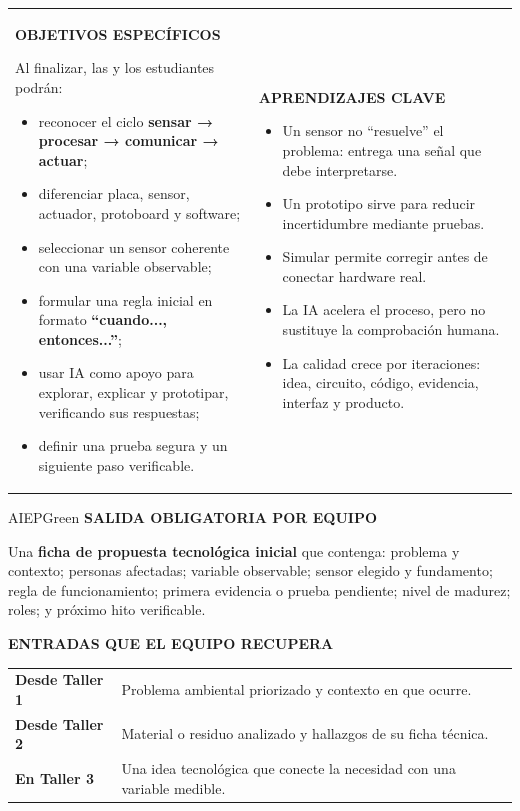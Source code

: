 \documentclass[10pt,a4paper]{article}
\newcommand{\labeltext}[1]{%
  {\scriptsize\bfseries\color{AIEPSlate}\MakeUppercase{#1}}\par\vspace{1.2mm}
}
\begin{document}
\begin{tabularx}{\textwidth}{Y Y}
\begin{card}[height=69mm,valign=top]
\labeltext{Objetivos específicos}
Al finalizar, las y los estudiantes podrán:
\begin{itemize}
  \item reconocer el ciclo \textbf{sensar → procesar → comunicar → actuar};
  \item diferenciar placa, sensor, actuador, protoboard y software;
  \item seleccionar un sensor coherente con una variable observable;
  \item formular una regla inicial en formato \textbf{“cuando..., entonces...”};
  \item usar IA como apoyo para explorar, explicar y prototipar, verificando sus respuestas;
  \item definir una prueba segura y un siguiente paso verificable.
\end{itemize}
\end{card}
&
\begin{card}[height=69mm,valign=top]
\labeltext{Aprendizajes clave}
\begin{itemize}
  \item Un sensor no “resuelve” el problema: entrega una señal que debe interpretarse.
  \item Un prototipo sirve para reducir incertidumbre mediante pruebas.
  \item Simular permite corregir antes de conectar hardware real.
  \item La IA acelera el proceso, pero no sustituye la comprobación humana.
  \item La calidad crece por iteraciones: idea, circuito, código, evidencia, interfaz y producto.
\end{itemize}
\end{card}
\end{tabularx}

\begin{softcard}{AIEPGreen}
\labeltext{Salida obligatoria por equipo}
Una \textbf{ficha de propuesta tecnológica inicial} que contenga: problema y contexto; personas
afectadas; variable observable; sensor elegido y fundamento; regla de funcionamiento; primera
evidencia o prueba pendiente; nivel de madurez; roles; y próximo hito verificable.
\end{softcard}

\begin{card}
\labeltext{Entradas que el equipo recupera}
\begin{tabularx}{\textwidth}{@{}L{39mm}Y@{}}
\textbf{Desde Taller 1} & Problema ambiental priorizado y contexto en que ocurre.\\
\textbf{Desde Taller 2} & Material o residuo analizado y hallazgos de su ficha técnica.\\
\textbf{En Taller 3} & Una idea tecnológica que conecte la necesidad con una variable medible.\\
\end{tabularx}
\end{card}
\end{document}

